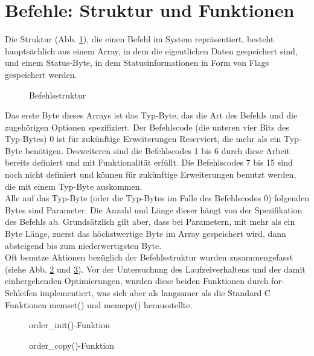 \section{Befehle: Struktur und Funktionen}
Die Struktur (Abb. \ref{order_type}), die einen Befehl im System repräsentiert, besteht hauptsächlich aus einem Array, in dem die eigentlichen Daten
gespeichert sind, und einem Status-Byte, in dem Statusinformationen in Form von Flags gespeichert werden.
\begin{figure}[htb]
 \centering
 \caption{\label{order_type}Befehlsstruktur}
\end{figure}
Das erste Byte dieses Arrays ist das Typ-Byte, das die Art des Befehls und die zugehörigen Optionen spezifiziert. Der
Befehlscode (die unteren vier Bits des Typ-Bytes) 0 ist für zukünftige Erweiterungen Reserviert, die mehr als ein Typ-Byte
benötigen. Desweiteren sind die Befehlscodes 1 bis 6 durch diese Arbeit bereits definiert und mit Funktionalität erfüllt.
Die Befehlscodes 7 bis 15 sind noch nicht definiert und können für zukünftige Erweiterungen benutzt werden, die mit einem
Typ-Byte auskommen.\\
Alle auf das Typ-Byte (oder die Typ-Bytes im Falle des Befehlscodes 0) folgenden Bytes sind Parameter. Die Anzahl und Länge
dieser hängt von der Spezifikation des Befehls ab. Grundsätzlich gilt aber, dass bei Parametern, mit mehr als ein Byte Länge,
zuerst das höchstwertige Byte im Array gespeichert wird, dann absteigend bis zum niederwertigsten Byte.\\
Oft benutze Aktionen bezüglich der Befehlsstruktur wurden zusammengefasst (siehe Abb. \ref{order_init} und \ref{order_copy}).
Vor der Untersuchung des Laufzeiverhaltens und der damit einhergehenden Optimierungen, wurden diese beiden Funktionen
durch for-Schleifen implementiert, was sich aber als langsamer als die Standard C Funktionen memset() und memcpy()
herausstellte.
\begin{figure}[htb]
 \centering
 \caption{\label{order_init}order\_init()-Funktion}
\end{figure}
\begin{figure}[htb]
 \centering
 \caption{\label{order_copy}order\_copy()-Funktion}
\end{figure}
